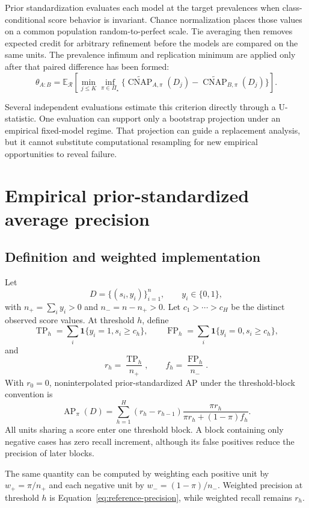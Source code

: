 \documentclass[11pt]{article}
\newcommand{\AP}{\operatorname{AP}}
\newcommand{\CNAP}{\operatorname{CNAP}}
\newcommand{\Regime}{\mathcal{R}}
\newcommand{\PSet}{\Pi_\star}
\newcommand{\E}{\mathbb{E}}
\newcommand{\CNAPta}{\widetilde{\CNAP}}
\theoremstyle{remark}
\begin{document}
Prior standardization evaluates each model at the target prevalences when class-conditional score behavior is invariant. Chance normalization places those values on a common population random-to-perfect scale. Tie averaging then removes expected credit for arbitrary refinement before the models are compared on the same units. The prevalence infimum and replication minimum are applied only after that paired difference has been formed:
\[
\theta_{A:B}
=
\E_{\Regime}
\left[
\min_{j\leq K}
\inf_{\pi\in\PSet}
\{\CNAPta_{A,\pi}(D_j)-\CNAPta_{B,\pi}(D_j)\}
\right].
\]

Several independent evaluations estimate this criterion directly through a U-statistic. One evaluation can support only a bootstrap projection under an empirical fixed-model regime. That projection can guide a replacement analysis, but it cannot substitute computational resampling for new empirical opportunities to reveal failure.

\appendix

\section{Empirical prior-standardized average precision}
\label{app:ap}

\subsection{Definition and weighted implementation}

Let
\[
D=\{(s_i,y_i)\}_{i=1}^{n},
\qquad
y_i\in\{0,1\},
\]
with $n_+=\sum_i y_i>0$ and $n_-=n-n_+>0$. Let $c_1>\cdots>c_H$ be the distinct observed score values. At threshold $h$, define
\[
\operatorname{TP}_h
=
\sum_i\mathbf 1\{y_i=1,s_i\geq c_h\},
\qquad
\operatorname{FP}_h
=
\sum_i\mathbf 1\{y_i=0,s_i\geq c_h\},
\]
and
\[
r_h=\frac{\operatorname{TP}_h}{n_+},
\qquad
f_h=\frac{\operatorname{FP}_h}{n_-}.
\]
With $r_0=0$, noninterpolated prior-standardized AP under the threshold-block convention is
\begin{equation}
\AP_\pi(D)
=
\sum_{h=1}^{H}
(r_h-r_{h-1})
\frac{\pi r_h}
{\pi r_h+(1-\pi)f_h}.
\label{eq:empirical-ap}
\end{equation}
All units sharing a score enter one threshold block. A block containing only negative cases has zero recall increment, although its false positives reduce the precision of later blocks.

The same quantity can be computed by weighting each positive unit by $w_+=\pi/n_+$ and each negative unit by $w_-=(1-\pi)/n_-$. Weighted precision at threshold $h$ is Equation~\eqref{eq:reference-precision}, while weighted recall remains $r_h$.
\end{document}
